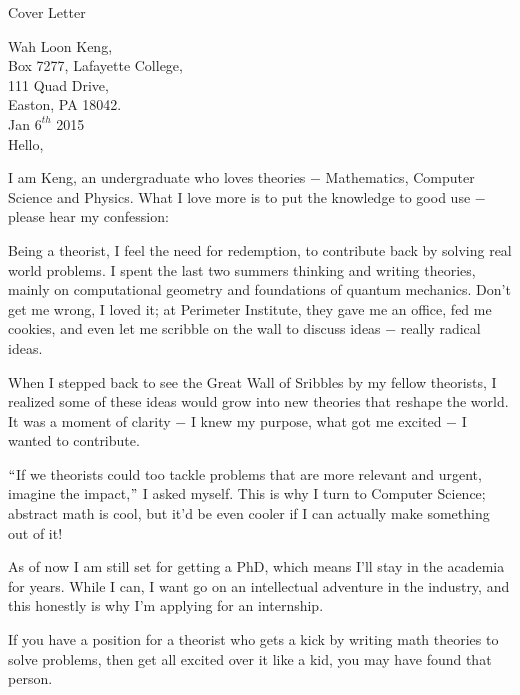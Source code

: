 \documentclass{resume} %
\begin{document}
\begin{rSection}{Cover Letter}


\end{rSection}


Wah Loon Keng,\\
Box 7277, Lafayette College,\\
111 Quad Drive,\\
Easton, PA 18042.\\

Jan $6^{th}$ 2015\\


Hello,

I am Keng, an undergraduate who loves theories $-$ Mathematics, Computer Science and Physics. What I love more is to put the knowledge to good use $-$ please hear my confession:

Being a theorist, I feel the need for redemption, to contribute back by solving real world problems. I spent the last two summers thinking and writing theories, mainly on computational geometry and foundations of quantum mechanics. Don't get me wrong, I loved it; at Perimeter Institute, they gave me an office, fed me cookies, and even let me scribble on the wall to discuss ideas $-$ really radical ideas.

When I stepped back to see the Great Wall of Sribbles by my fellow theorists, I realized some of these ideas would grow into new theories that reshape the world. It was a moment of clarity $-$ I knew my purpose, what got me excited $-$ I wanted to contribute.

$``$If we theorists could too tackle problems that are more relevant and urgent, imagine the impact,$"$ I asked myself. This is why I turn to Computer Science; abstract math is cool, but it'd be even cooler if I can actually make something out of it!

As of now I am still set for getting a PhD, which means I'll stay in the academia for years. While I can, I want go on an intellectual adventure in the industry, and this honestly is why I'm applying for an internship. 

If you have a position for a theorist who gets a kick by writing math theories to solve problems, then get all excited over it like a kid, you may have found that person.
\end{document}
